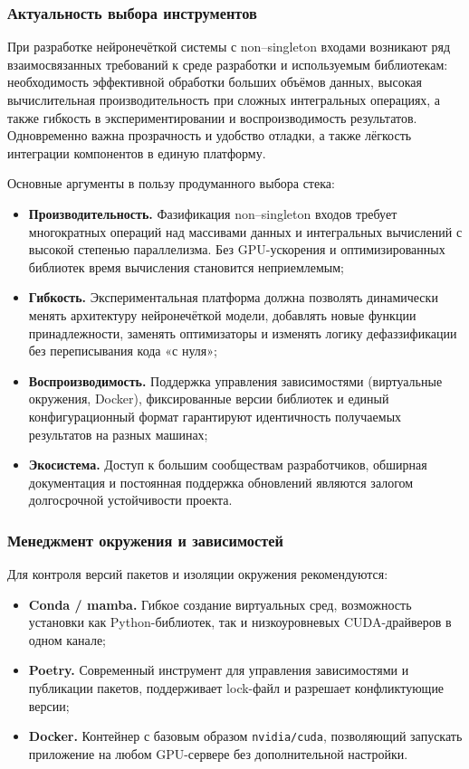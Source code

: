 \subsubsection{Актуальность выбора инструментов}
\label{subsubsec:why_tools}

При разработке нейронечёткой системы с non–singleton входами возникают
ряд взаимосвязанных требований к среде разработки и используемым библиотекам:
необходимость эффективной обработки больших объёмов данных,
высокая вычислительная производительность при сложных интегральных операциях,
а также гибкость в экспериментировании и воспроизводимость результатов.
Одновременно важна прозрачность и удобство отладки, а также лёгкость
интеграции компонентов в единую платформу.

\medskip

\noindent Основные аргументы в пользу продуманного выбора стека:
\begin{itemize}
  \item \textbf{Производительность.} Фазификация non–singleton входов
        требует многократных операций над массивами данных и
        интегральных вычислений с высокой степенью параллелизма.
        Без GPU-ускорения и оптимизированных библиотек
        время вычисления становится неприемлемым;
  \item \textbf{Гибкость.} Экспериментальная платформа должна
        позволять динамически менять архитектуру нейронечёткой модели,
        добавлять новые функции принадлежности, заменять оптимизаторы
        и изменять логику дефаззификации без переписывания кода «с нуля»;
  \item \textbf{Воспроизводимость.} Поддержка управления зависимостями
        (виртуальные окружения, Docker), фиксированные версии библиотек
        и единый конфигурационный формат гарантируют
        идентичность получаемых результатов на разных машинах;
  \item \textbf{Экосистема.} Доступ к большим сообществам разработчиков,
        обширная документация и постоянная поддержка обновлений
        являются залогом долгосрочной устойчивости проекта.
\end{itemize}

\subsubsection{Менеджмент окружения и зависимостей}

Для контроля версий пакетов и изоляции окружения рекомендуются:
\begin{itemize}
  \item \textbf{Conda / mamba.} Гибкое создание виртуальных сред,
        возможность установки как Python-библиотек, так и
        низкоуровневых CUDA-драйверов в одном канале;
  \item \textbf{Poetry.} Современный инструмент для управления
        зависимостями и публикации пакетов, поддерживает lock-файл
        и разрешает конфликтующие версии;
  \item \textbf{Docker.} Контейнер с базовым образом \verb|nvidia/cuda|,
        позволяющий запускать приложение на любом GPU-сервере
        без дополнительной настройки.
\end{itemize}

